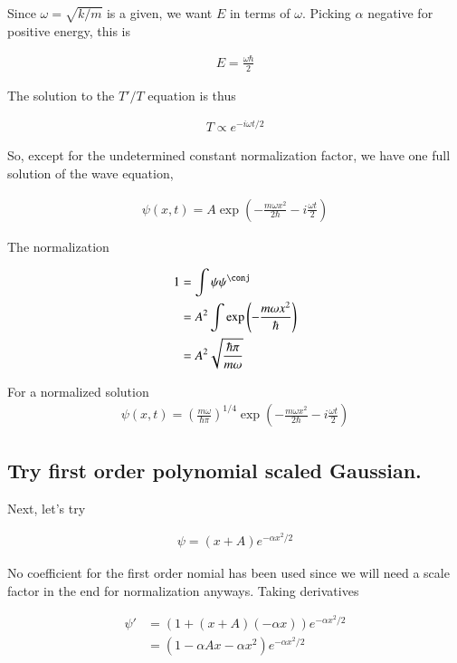 \documentclass{article}
\begin{document}
Since $\omega = \sqrt{k/m}$ is a given, we want $E$ in terms of $\omega$.  Picking $\alpha$ negative for positive energy, this is

\begin{align*}
E = \frac{ \omega \hbar }{ 2 } 
\end{align*}

The solution to the $T'/T$ equation is thus

\begin{align*}
T \propto e^{-i \omega t/2}
\end{align*}

So, except for the undetermined constant normalization factor, we have one full solution of the wave equation, 

\begin{align*}
\psi(x,t) = A \exp\left( - \frac{m \omega x^2 }{2 \hbar} - i \frac{\omega t}{2} \right)
\end{align*}

The normalization

\begin{align*}
1 
&= \int \psi \psi^\conj \\
&= A^2 \int \exp\left( - \frac{m \omega x^2 }{\hbar} \right) \\
&= A^2 \sqrt{ \frac{\hbar \pi}{ m \omega } }
\end{align*}

For a normalized solution
\begin{align}
\psi(x,t) = \left( 
\frac{ m \omega }{\hbar \pi}
\right)^{1/4} \exp\left( - \frac{m \omega x^2 }{2 \hbar} - i \frac{\omega t}{2} \right)
\end{align}

\subsection{Try first order polynomial scaled Gaussian. }

Next, let's try 

\begin{align*}
\psi = (x + A) e^{-\alpha x^2/2}
\end{align*}

No coefficient for the first order nomial has been used since we will need a scale factor in the end for normalization anyways.  Taking derivatives

\begin{align*}
\psi' 
&= (1 + (x + A)(-\alpha x)) e^{-\alpha x^2/2} \\
&= (1 - \alpha A x - \alpha x^2 ) e^{-\alpha x^2/2} \\
\end{align*}
\end{document}
